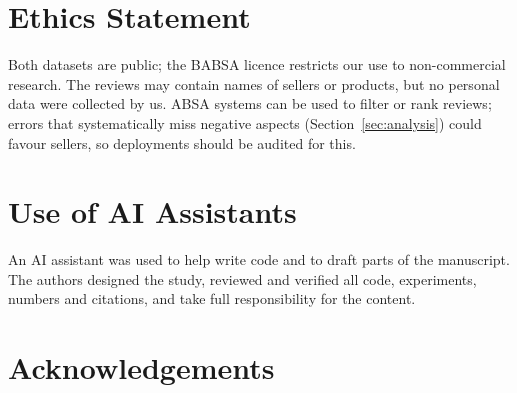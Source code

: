 \documentclass[11pt]{article}
\begin{document}
\section*{Ethics Statement}
Both datasets are public; the BABSA licence restricts our use to non-commercial research. The reviews
may contain names of sellers or products, but no personal data were collected by us. ABSA systems can
be used to filter or rank reviews; errors that systematically miss negative aspects
(Section~\ref{sec:analysis}) could favour sellers, so deployments should be audited for this.

\section*{Use of AI Assistants}
An AI assistant was used to help write code and to draft parts of the manuscript. The authors designed
the study, reviewed and verified all code, experiments, numbers and citations, and take full
responsibility for the content.

\section*{Acknowledgements}



\end{document}
